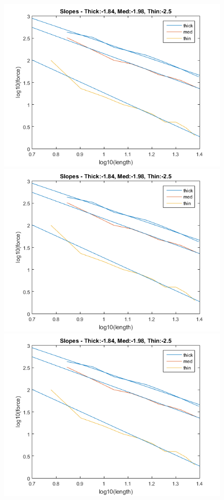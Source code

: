 \documentclass{article}
\begin{document}
\begin{figure}[h]
	\begin{minipage}{0.32\textwidth}
		\centering
		\includegraphics[scale=.3]{Lab1f1.png}
	\end{minipage}
	\begin{minipage}{0.32\textwidth}
		\centering
		\includegraphics[scale=.3]{Lab1f1.png}
	\end{minipage}
	\begin{minipage}{0.32\textwidth}
		\centering
		\includegraphics[scale=.3]{Lab1f1.png}

\end{minipage}
\end{figure}
\end{document}
